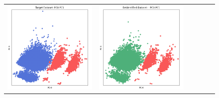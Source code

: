 \begin{figure}[p!]
\begin{tabular}{@{} M{0.166\textwidth} M{0.166\textwidth} | M{0.166\textwidth} M{0.166\textwidth} | M{0.166\textwidth} M{0.166\textwidth} @{}}
       \includegraphics[width=\linewidth]{z_SMOTE.orig.png} &
       \includegraphics[width=\linewidth]{z_SMOTE.syn.png} &

\end{tabular}
\end{figure}

